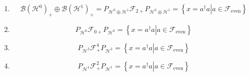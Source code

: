 \documentclass[aps,preprint]{revtex4}
\begin{document}
\begin{enumerate}
\begin{enumerate}
\begin{enumerate}
\item 
\begin{equation}
\mathcal{S}^{1}=\mathcal{H}^{0}\oplus \mathcal{H}^{1}
\end{equation}

\item 
\begin{equation}
\mathcal{S}^{2}=\mathcal{H}^{0}\oplus \mathcal{H}^{1}\oplus \mathcal{H}^{2}
\end{equation}

\item 
\begin{equation}
\mathcal{B}\left( \mathcal{S}^{n}\right) =\bigoplus\limits_{0\leq p,q\leq n}%
\mathcal{B}\left( \mathcal{H}^{p},\mathcal{H}^{q}\right) ;\quad 0\leq n\leq 2
\end{equation}

\item 
\begin{eqnarray}
P_{S^{0}} &=&P_{H^{0}} \\
P_{S^{1}} &=&P_{H^{0}}+P_{H^{1}} \\
P_{S^{2}} &=&P_{H^{0}}+P_{H^{1}}+P_{H^{2}}
\end{eqnarray}
\end{enumerate}

\item 
\begin{equation}
\mathcal{B}\left( \mathcal{H}^{0}\right) _{+}\oplus \mathcal{B}\left( 
\mathcal{H}^{1}\right) _{+}=P_{\mathcal{H}^{0}\oplus \mathcal{H}^{1}}%
\mathcal{F}_{2+}P_{\mathcal{H}^{0}\oplus \mathcal{H}^{1}}=\left\{ \left.
x=a^{\dagger }a\right\vert a\in \mathcal{F}_{\text{even}}\right\}
\end{equation}

\item 
\begin{equation}
P_{\mathcal{H}^{0}}\mathcal{F}_{0+}P_{\mathcal{H}^{0}}=\left\{ \left.
x=a^{\dagger }a\right\vert a\in \mathcal{F}_{\text{even}}\right\}
\end{equation}

\item 
\begin{equation}
P_{\mathcal{H}^{2}}\mathcal{F}_{+}^{4}P_{\mathcal{H}^{2}}=\left\{ \left.
x=a^{\dagger }a\right\vert a\in \mathcal{F}_{\text{even}}\right\}
\end{equation}

\item 
\begin{equation}
P_{\mathcal{H}^{1}}\mathcal{F}_{+}^{2}P_{\mathcal{H}^{1}}=\left\{ \left.
x=a^{\dagger }a\right\vert a\in \mathcal{F}_{\text{even}}\right\}
\end{equation}


\end{enumerate}
\end{enumerate}
\end{document}
